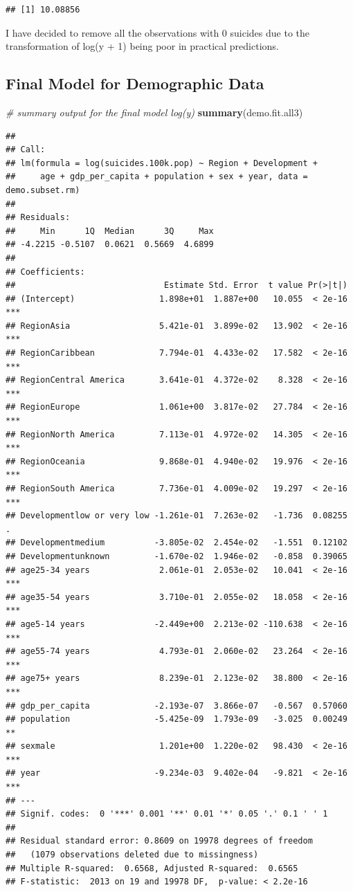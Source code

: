 \documentclass[11pt,]{article}
\newenvironment{Shaded}{\begin{snugshade}}{\end{snugshade}}
\newcommand{\CommentTok}[1]{\textcolor[rgb]{0.56,0.35,0.01}{\textit{#1}}}
\newcommand{\KeywordTok}[1]{\textcolor[rgb]{0.13,0.29,0.53}{\textbf{#1}}}
\newcommand{\NormalTok}[1]{#1}
\begin{document}
\begin{verbatim}
## [1] 10.08856
\end{verbatim}

I have decided to remove all the observations with 0 suicides due to the
transformation of log(y + 1) being poor in practical predictions.

\hypertarget{final-model-for-demographic-data}{%
\subsection{Final Model for Demographic
Data}\label{final-model-for-demographic-data}}

\begin{Shaded}
\begin{Highlighting}[]
\CommentTok{# summary output for the final model log(y)}
\KeywordTok{summary}\NormalTok{(demo.fit.all3)}
\end{Highlighting}
\end{Shaded}

\begin{verbatim}
## 
## Call:
## lm(formula = log(suicides.100k.pop) ~ Region + Development + 
##     age + gdp_per_capita + population + sex + year, data = demo.subset.rm)
## 
## Residuals:
##     Min      1Q  Median      3Q     Max 
## -4.2215 -0.5107  0.0621  0.5669  4.6899 
## 
## Coefficients:
##                              Estimate Std. Error  t value Pr(>|t|)    
## (Intercept)                 1.898e+01  1.887e+00   10.055  < 2e-16 ***
## RegionAsia                  5.421e-01  3.899e-02   13.902  < 2e-16 ***
## RegionCaribbean             7.794e-01  4.433e-02   17.582  < 2e-16 ***
## RegionCentral America       3.641e-01  4.372e-02    8.328  < 2e-16 ***
## RegionEurope                1.061e+00  3.817e-02   27.784  < 2e-16 ***
## RegionNorth America         7.113e-01  4.972e-02   14.305  < 2e-16 ***
## RegionOceania               9.868e-01  4.940e-02   19.976  < 2e-16 ***
## RegionSouth America         7.736e-01  4.009e-02   19.297  < 2e-16 ***
## Developmentlow or very low -1.261e-01  7.263e-02   -1.736  0.08255 .  
## Developmentmedium          -3.805e-02  2.454e-02   -1.551  0.12102    
## Developmentunknown         -1.670e-02  1.946e-02   -0.858  0.39065    
## age25-34 years              2.061e-01  2.053e-02   10.041  < 2e-16 ***
## age35-54 years              3.710e-01  2.055e-02   18.058  < 2e-16 ***
## age5-14 years              -2.449e+00  2.213e-02 -110.638  < 2e-16 ***
## age55-74 years              4.793e-01  2.060e-02   23.264  < 2e-16 ***
## age75+ years                8.239e-01  2.123e-02   38.800  < 2e-16 ***
## gdp_per_capita             -2.193e-07  3.866e-07   -0.567  0.57060    
## population                 -5.425e-09  1.793e-09   -3.025  0.00249 ** 
## sexmale                     1.201e+00  1.220e-02   98.430  < 2e-16 ***
## year                       -9.234e-03  9.402e-04   -9.821  < 2e-16 ***
## ---
## Signif. codes:  0 '***' 0.001 '**' 0.01 '*' 0.05 '.' 0.1 ' ' 1
## 
## Residual standard error: 0.8609 on 19978 degrees of freedom
##   (1079 observations deleted due to missingness)
## Multiple R-squared:  0.6568, Adjusted R-squared:  0.6565 
## F-statistic:  2013 on 19 and 19978 DF,  p-value: < 2.2e-16
\end{verbatim}
\end{document}
